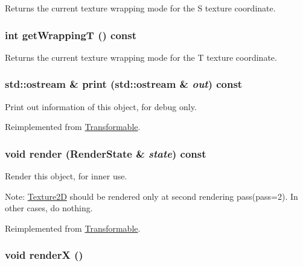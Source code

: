 Returns the current texture wrapping mode for the S texture coordinate. \hypertarget{classm3g_1_1Texture2D_58375e5e8ddde63dcf74f882d053ae3f}{
\subsubsection[{getWrappingT}]{\setlength{\rightskip}{0pt plus 5cm}int getWrappingT () const}}
\label{classm3g_1_1Texture2D_58375e5e8ddde63dcf74f882d053ae3f}


Returns the current texture wrapping mode for the T texture coordinate. \hypertarget{classm3g_1_1Texture2D_6fea17fa1532df3794f8cb39cb4f911f}{
\subsubsection[{print}]{\setlength{\rightskip}{0pt plus 5cm}std::ostream \& print (std::ostream \& {\em out}) const}}
\label{classm3g_1_1Texture2D_6fea17fa1532df3794f8cb39cb4f911f}


Print out information of this object, for debug only. 

Reimplemented from \hyperlink{classm3g_1_1Transformable_6fea17fa1532df3794f8cb39cb4f911f}{Transformable}.\hypertarget{classm3g_1_1Texture2D_8babc8a79b78615da51161e94029eea9}{
\subsubsection[{render}]{\setlength{\rightskip}{0pt plus 5cm}void render ({\bf RenderState} \& {\em state}) const}}
\label{classm3g_1_1Texture2D_8babc8a79b78615da51161e94029eea9}


Render this object, for inner use.

Note: \hyperlink{classm3g_1_1Texture2D}{Texture2D} should be rendered only at second rendering pass(pass=2). In other cases, do nothing. 

Reimplemented from \hyperlink{classm3g_1_1Transformable_8babc8a79b78615da51161e94029eea9}{Transformable}.\hypertarget{classm3g_1_1Texture2D_443a7a301f77f625335ecc06d13bad06}{
\subsubsection[{renderX}]{\setlength{\rightskip}{0pt plus 5cm}void renderX ()}}
\label{classm3g_1_1Texture2D_443a7a301f77f625335ecc06d13bad06}


